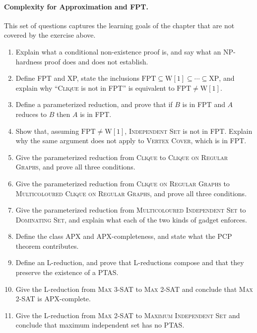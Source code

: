 \paragraph{Complexity for Approximation and FPT.}
This set of questions captures the learning goals of the chapter that are not
covered by the exercise above.
\begin{enumerate}
  \item Explain what a conditional non-existence proof is, and say what an
        NP-hardness proof does and does not establish.
  \item Define FPT and XP, state the inclusions
        $\mathrm{FPT} \subseteq \mathrm{W}[1] \subseteq \cdots \subseteq
        \mathrm{XP}$, and explain why ``\textsc{Clique} is not in FPT'' is
        equivalent to $\mathrm{FPT} \ne \mathrm{W}[1]$.
  \item Define a parameterized reduction, and prove that if $B$ is in FPT and
        $A$ reduces to $B$ then $A$ is in FPT.
  \item Show that, assuming $\mathrm{FPT} \ne \mathrm{W}[1]$,
        \textsc{Independent Set} is not in FPT. Explain why the same argument
        does not apply to \textsc{Vertex Cover}, which is in FPT.
  \item Give the parameterized reduction from \textsc{Clique} to
        \textsc{Clique on Regular Graphs}, and prove all three conditions.
  \item Give the parameterized reduction from \textsc{Clique on Regular Graphs}
        to \textsc{Multicoloured Clique on Regular Graphs}, and prove all three
        conditions.
  \item Give the parameterized reduction from \textsc{Multicoloured Independent
        Set} to \textsc{Dominating Set}, and explain what each of the two kinds
        of gadget enforces.
  \item Define the class APX and APX-completeness, and state what the PCP
        theorem contributes.
  \item Define an L-reduction, and prove that L-reductions compose and that
        they preserve the existence of a PTAS.
  \item Give the L-reduction from \textsc{Max 3-SAT} to \textsc{Max 2-SAT} and
        conclude that \textsc{Max 2-SAT} is APX-complete.
  \item Give the L-reduction from \textsc{Max 2-SAT} to \textsc{Maximum
        Independent Set} and conclude that maximum independent set has no PTAS.
\end{enumerate}

